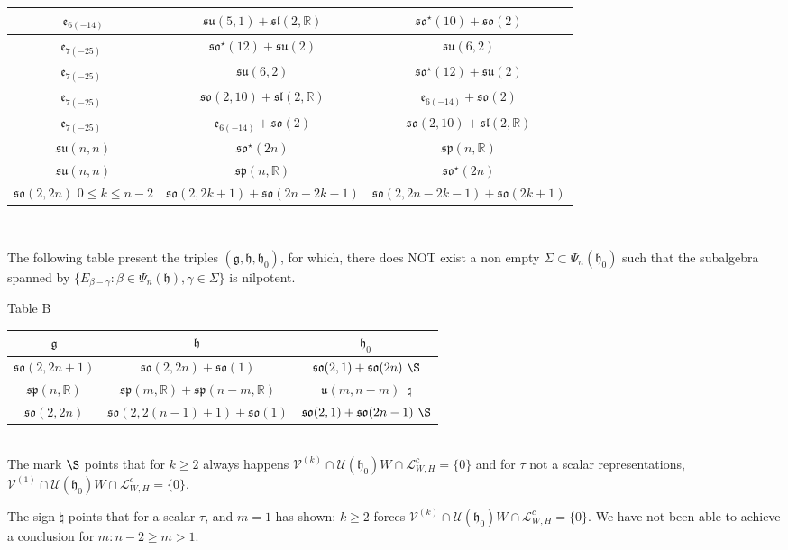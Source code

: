 \documentclass[12pt]{amsart}
\theoremstyle{definition}
\theoremstyle{remark}
\newcommand{\e}{\mathfrak{e}}
\newcommand{\g}{\mathfrak{g}}
\newcommand{\h}{\mathfrak{h}}
\numberwithin{equation}{section}
\begin{document}
\begin{center}
\begin{tabular}{|c| c | c|}
\hline $\e_{6(-14)}$ & $ \mathfrak{su}(5,1)+\mathfrak{sl}(2, \mathbb R) $ & $\mathfrak{so}^\star(10)+\mathfrak{so}(2) $ \\
\hline $\e_{7(-25)}$ $  $   & $\mathfrak{so}^\star(12)+\mathfrak{su}(2) $ & $\mathfrak{su}(6,2)$ \\
\hline $\e_{7(-25)}$ $ $   & $ \mathfrak{su}(6,2) $ & $\mathfrak{so}^\star(12)+\mathfrak{su}(2)  $ \\
\hline $\e_{7(-25)}$ $  $ & $\mathfrak{so}(2,10)+\mathfrak{sl}(2, \mathbb R)   $ & $\e_{6(-14)} + \mathfrak{so}(2)$ \\
\hline $\e_{7(-25)}$ $  $ & $\e_{6(-14)} + \mathfrak{so}(2)    $ & $\mathfrak{so}(2,10)+\mathfrak{sl}(2, \mathbb R) $ \\
\hline   $\mathfrak{su}(n,n)$  & $\mathfrak{so}^\star(2n)$ &$\mathfrak{sp}(n,\mathbb R)$       \\
\hline   $\mathfrak{su}(n,n)$  & $ \mathfrak{sp}(n,\mathbb R)$ &$\mathfrak{so}^\star(2n) $       \\
\hline   $\mathfrak{so}(2,2n)$ $0\leq k\leq n-2$ & $\mathfrak{so}(2,2k+1)+ \mathfrak{so}(2n-2k-1)$   & $\mathfrak{so}(2,2n-2k-1)+ \mathfrak{so}(2k+1)$      \\
\hline
\end{tabular} \\
\end{center}
\begin{center}
The following table present the triples $(\g, \h, \h_0)$, for which, there does NOT  exist  a non empty $\Sigma \subset \Psi_n(\h_0)$  such that the subalgebra spanned by $\{E_{\beta -\gamma} : \beta \in \Psi_n(\h), \gamma \in \Sigma\}$ is  nilpotent.
\end{center}
\begin{center}
Table B
\begin{tabular}{|c| c | c|}
\hline   $\g$  &   $\h \, $   &  $\h_0 \,   $     \\
\hline   $\mathfrak{so}(2,2n+1)$    & $\mathfrak{so}(2,2n)+ \mathfrak{so}(1)$ & $\mathfrak{so}(2,1)+ \mathfrak{so}(2n)\,\,\S$       \\
\hline   $\mathfrak{sp}(n, \mathbb R)$  & $ \mathfrak{sp}(m, \mathbb R)+ \mathfrak{sp}(n-m, \mathbb R)$ & $\mathfrak{u}(m,n-m) \,\,\,  \natural $    \\
\hline   $\mathfrak{so}(2,2n)$  & $\mathfrak{so}(2,2(n-1)+1)+ \mathfrak{so}(1  )$   & $\mathfrak{so}(2,1)+ \mathfrak{so}(2n-1)\,\,\S$      \\
\hline
\end{tabular} \\
The mark $\S$ points that for $k\geq 2$ always happens $\mathcal V^{(k)}\cap  \mathcal U(\h_0)W \cap    \mathcal L_{W,H}^c=\{0\}$ and for  $\tau$ not a scalar representations,          $\mathcal V^{(1)}\cap  \mathcal U(\h_0)W \cap    \mathcal L_{W,H}^c=\{0\}$.

The sign $\natural$ points that for a scalar $\tau$, and $m=1$ \cite{KP2} has shown: $k\geq 2$ forces $\mathcal V^{(k)}\cap  \mathcal U(\h_0)W \cap    \mathcal L_{W,H}^c=\{0\}$. We have not been able to achieve a conclusion for $m : n-2 \geq m>1$.
\end{center}
\end{document}
